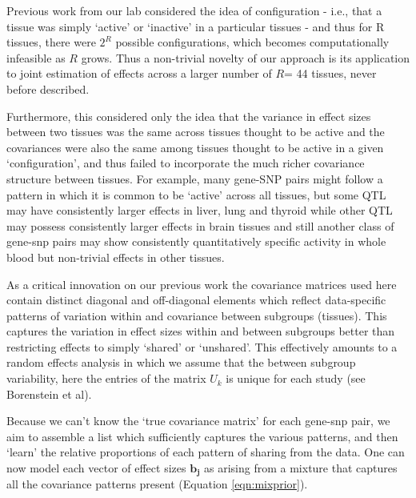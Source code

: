 Previous work from our lab considered the idea of configuration - i.e., that a tissue was simply `active' or `inactive' in a particular tissues - and thus for R tissues, there were $2^{R}$ possible configurations, which becomes computationally infeasible as $R$ grows. Thus a non-trivial novelty of our approach is its application to joint estimation of effects across a larger number of $R$= 44 tissues, never before described.

Furthermore, this considered only the idea that the variance in effect sizes between two tissues was the same across tissues thought to be active and the covariances were also the same among tissues thought to be active in a given `configuration',  and thus failed to incorporate the much richer covariance structure between tissues. For example, many gene-SNP pairs might follow a pattern in which it is common to be `active' across all tissues, but some QTL may have consistently larger effects in liver, lung and thyroid while other QTL may possess consistently larger effects in brain tissues and still another class of gene-snp pairs may show consistently quantitatively specific activity in whole blood but non-trivial effects in other tissues. 

As a critical innovation on our previous work \cite{flutre_statistical_2013,wen_bayesian_2014} the covariance matrices used here contain distinct diagonal and off-diagonal elements which reflect data-specific patterns of variation within and covariance between subgroups (tissues). This captures the variation in effect sizes within and between subgroups better than restricting effects to simply `shared' or `unshared'. This effectively amounts to a random effects analysis in which we assume that the between subgroup variability, here the entries of the matrix $U_{k}$ is unique for each study (see Borenstein et al).

Because we can't know the `true covariance matrix' for each gene-snp pair, we aim to assemble a list which sufficiently captures the various patterns, and then `learn' the relative proportions of each pattern of sharing from the data. One can now model each vector of effect sizes $\bm{b_{j}}$ as arising from a mixture that captures all the covariance patterns present (Equation \ref{eqn:mixprior}).

